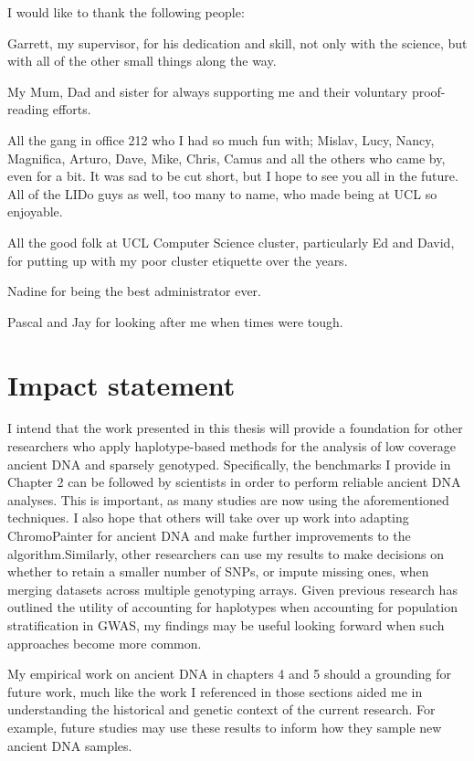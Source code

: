 \begin{acknowledgements}
\noindent
I would like to thank the following people:

\noindent
Garrett, my supervisor, for his dedication and skill, not only with the science, but with all of the other small things along the way. 

\noindent
My Mum, Dad and sister for always supporting me and their voluntary proof-reading efforts.

\noindent
All the gang in office 212 who I had so much fun with; Mislav, Lucy, Nancy, Magnifica, Arturo, Dave, Mike, Chris, Camus and all the others who came by, even for a bit. It was sad to be cut short, but I hope to see you all in the future. All of the LIDo guys as well, too many to name, who made being at UCL so enjoyable. 


\noindent
All the good folk at UCL Computer Science cluster, particularly Ed and David, for putting up with my poor cluster etiquette over the years. 

\noindent
Nadine for being the best administrator ever.

\noindent
Pascal and Jay for looking after me when times were tough. 
\end{acknowledgements}


\section{Impact statement}

I intend that the work presented in this thesis will provide a foundation for other researchers who apply haplotype-based methods for the analysis of low coverage ancient DNA and sparsely genotyped. Specifically, the benchmarks I provide in Chapter 2 can be followed by scientists in order to perform reliable ancient DNA analyses. This is important, as many studies are now using the aforementioned techniques. I also hope that others will take over up work into adapting ChromoPainter for ancient DNA and make further improvements to the algorithm.Similarly, other researchers can use my results to make decisions on whether to retain a smaller number of SNPs, or impute missing ones, when merging datasets across multiple genotyping arrays. Given previous research has outlined the utility of accounting for haplotypes when accounting for population stratification in GWAS, my findings may be useful looking forward when such approaches become more common. 

My empirical work on ancient DNA in chapters 4 and 5 should a grounding for future work, much like the work I referenced in those sections aided me in understanding the historical and genetic context of the current research. For example, future studies may use these results to inform how they sample new ancient DNA samples. 


